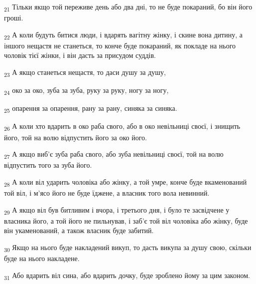 \begin{tcolorbox}
\textsubscript{21} Тільки якщо той переживе день або два дні, то не буде покараний, бо він його гроші.
\end{tcolorbox}
\begin{tcolorbox}
\textsubscript{22} А коли будуть битися люди, і вдарять вагітну жінку, і скине вона дитину, а іншого нещастя не станеться, то конче буде покараний, як покладе на нього чоловік тієї жінки, і він дасть за присудом суддів.
\end{tcolorbox}
\begin{tcolorbox}
\textsubscript{23} А якщо станеться нещастя, то даси душу за душу,
\end{tcolorbox}
\begin{tcolorbox}
\textsubscript{24} око за око, зуба за зуба, руку за руку, ногу за ногу,
\end{tcolorbox}
\begin{tcolorbox}
\textsubscript{25} опарення за опарення, рану за рану, синяка за синяка.
\end{tcolorbox}
\begin{tcolorbox}
\textsubscript{26} А коли хто вдарить в око раба свого, або в око невільниці своєї, і знищить його, той на волю відпустить його за око його.
\end{tcolorbox}
\begin{tcolorbox}
\textsubscript{27} А якщо виб'є зуба раба свого, або зуба невільниці своєї, той на волю відпустить того за зуба його.
\end{tcolorbox}
\begin{tcolorbox}
\textsubscript{28} А коли віл ударить чоловіка або жінку, а той умре, конче буде вкаменований той віл, і м'ясо його не буде їджене, а власник того вола невинний.
\end{tcolorbox}
\begin{tcolorbox}
\textsubscript{29} А якщо віл був битливим і вчора, і третього дня, і було те засвідчене у власника його, а той його не пильнував, і заб'є той віл чоловіка або жінку, буде він укаменований, а також власник буде забитий.
\end{tcolorbox}
\begin{tcolorbox}
\textsubscript{30} Якщо на нього буде накладений викуп, то дасть викупа за душу свою, скільки буде на нього накладене.
\end{tcolorbox}
\begin{tcolorbox}
\textsubscript{31} Або вдарить віл сина, або вдарить дочку, буде зроблено йому за цим законом.
\end{tcolorbox}

